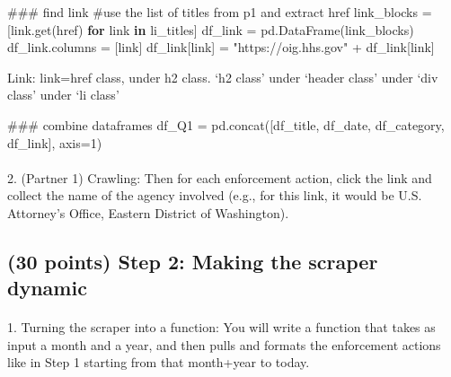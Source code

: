 \documentclass[
  letterpaper,
  DIV=11,
  numbers=noendperiod]{scrartcl}
\makeatletter
\let\oldparagraph\paragraph
\renewcommand{\paragraph}{
    \@ifstar
      \xxxParagraphStar
      \xxxParagraphNoStar
  }
\newcommand{\xxxParagraphStar}[1]{\oldparagraph*{#1}\mbox{}}
\newcommand{\xxxParagraphNoStar}[1]{\oldparagraph{#1}\mbox{}}
\newenvironment{Shaded}{\begin{snugshade}}{\end{snugshade}}
\newcommand{\CommentTok}[1]{\textcolor[rgb]{0.37,0.37,0.37}{#1}}
\newcommand{\ControlFlowTok}[1]{\textcolor[rgb]{0.00,0.23,0.31}{\textbf{#1}}}
\newcommand{\DecValTok}[1]{\textcolor[rgb]{0.68,0.00,0.00}{#1}}
\newcommand{\KeywordTok}[1]{\textcolor[rgb]{0.00,0.23,0.31}{\textbf{#1}}}
\newcommand{\NormalTok}[1]{\textcolor[rgb]{0.00,0.23,0.31}{#1}}
\newcommand{\OperatorTok}[1]{\textcolor[rgb]{0.37,0.37,0.37}{#1}}
\newcommand{\StringTok}[1]{\textcolor[rgb]{0.13,0.47,0.30}{#1}}
\makeatother
\begin{document}
\begin{Shaded}
\begin{Highlighting}[]
\CommentTok{\#\#\# find link}
\CommentTok{\#use the list of titles from p1 and extract href}
\NormalTok{link\_blocks }\OperatorTok{=}\NormalTok{ [link.get(}\StringTok{\textquotesingle{}href\textquotesingle{}}\NormalTok{) }\ControlFlowTok{for}\NormalTok{ link }\KeywordTok{in}\NormalTok{ li\_titles]}
\NormalTok{df\_link }\OperatorTok{=}\NormalTok{ pd.DataFrame(link\_blocks)}
\NormalTok{df\_link.columns }\OperatorTok{=}\NormalTok{ [}\StringTok{\textquotesingle{}link\textquotesingle{}}\NormalTok{]}
\NormalTok{df\_link[}\StringTok{\textquotesingle{}link\textquotesingle{}}\NormalTok{] }\OperatorTok{=} \StringTok{"https://oig.hhs.gov"} \OperatorTok{+}\NormalTok{ df\_link[}\StringTok{\textquotesingle{}link\textquotesingle{}}\NormalTok{]}
\end{Highlighting}
\end{Shaded}

Link: link=href class, under h2 class. `h2 class' under `header class'
under `div class' under `li class'

\begin{Shaded}
\begin{Highlighting}[]
\CommentTok{\#\#\# combine dataframes}
\NormalTok{df\_Q1 }\OperatorTok{=}\NormalTok{ pd.concat([df\_title, df\_date, df\_category, df\_link], axis}\OperatorTok{=}\DecValTok{1}\NormalTok{)}
\end{Highlighting}
\end{Shaded}

\paragraph{2. (Partner 1) Crawling: Then for each enforcement action,
click the link and collect the name of the agency involved (e.g., for
this link, it would be U.S. Attorney's Office, Eastern District of
Washington).}\label{partner-1-crawling-then-for-each-enforcement-action-click-the-link-and-collect-the-name-of-the-agency-involved-e.g.-for-this-link-it-would-be-u.s.-attorneys-office-eastern-district-of-washington.}

\subsection{(30 points) Step 2: Making the scraper
dynamic}\label{points-step-2-making-the-scraper-dynamic}

\paragraph{1. Turning the scraper into a function: You will write a
function that takes as input a month and a year, and then pulls and
formats the enforcement actions like in Step 1 starting from that
month+year to
today.}\label{turning-the-scraper-into-a-function-you-will-write-a-function-that-takes-as-input-a-month-and-a-year-and-then-pulls-and-formats-the-enforcement-actions-like-in-step-1-starting-from-that-monthyear-to-today.}
\end{document}
